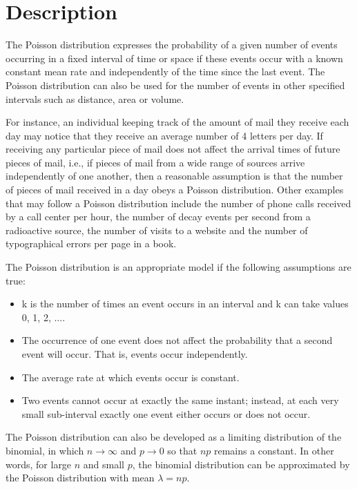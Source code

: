 \section{Description}
The Poisson distribution expresses the probability of a given number of events occurring in a fixed interval of time or space if these events occur with a known constant mean rate and independently of the time since the last event. The Poisson distribution can also be used for the number of events in other specified intervals such as distance, area or volume.

For instance, an individual keeping track of the amount of mail they receive each day may notice that they receive an average number of 4 letters per day. If receiving any particular piece of mail does not affect the arrival times of future pieces of mail, i.e., if pieces of mail from a wide range of sources arrive independently of one another, then a reasonable assumption is that the number of pieces of mail received in a day obeys a Poisson distribution. Other examples that may follow a Poisson distribution include the number of phone calls received by a call center per hour, the number of decay events per second from a radioactive source, the number of visits to a website and the number of typographical errors per page in a book.

The Poisson distribution is an appropriate model if the following assumptions are true:

\begin{itemize}
	\item k is the number of times an event occurs in an interval and k can take values 0, 1, 2, ....
	\item The occurrence of one event does not affect the probability that a second event will occur. That is, events occur independently.
	\item The average rate at which events occur is constant.
	\item Two events cannot occur at exactly the same instant; instead, at each very small sub-interval exactly one event either occurs or does not occur.
\end{itemize}

The Poisson distribution can also be developed as a limiting distribution of the binomial, in which $n \rightarrow \infty$ and $p \rightarrow 0$ so that $np$ remains a constant. In other words, for large $n$ and small $p$, the binomial distribution can be approximated by the Poisson distribution with mean $\lambda = np$.

